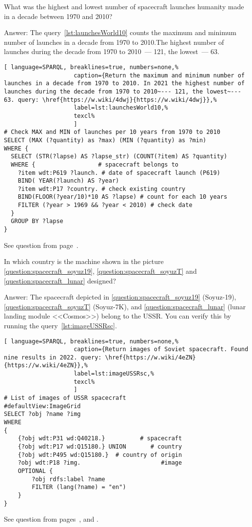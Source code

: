 \label{answer:max-min-space-launches}
\begin{exercise}
	What was the highest and lowest number of spacecraft launches humanity made in a decade between 1970 and 2010?
\end{exercise}
Answer: The query~\ref{lst:launchesWorld10} counts the maximum and minimum number of launches in a decade from 1970 to 2010.The highest number of launches during the decade from 1970 to 2010~--- 121, the lowest~--- 63.
\begin{lstlisting}[ language=SPARQL, breaklines=true, numbers=none,%
                    caption={Return the maximum and minimum number of launches in a decade from 1970 to 2010. In 2021 the highest number of launches during the decade from 1970 to 2010~--- 121, the lowest~--- 63. query: \href{https://w.wiki/4dwj}{https://w.wiki/4dwj}},%
                    label=lst:launchesWorld10,%
                    texcl%
                    ]
# Check MAX and MIN of launches per 10 years from 1970 to 2010
SELECT (MAX (?quantity) as ?max) (MIN (?quantity) as ?min)
WHERE {
  SELECT (STR(?lapse) AS ?lapse_str) (COUNT(?item) AS ?quantity)
  WHERE {                  # spacecraft belongs to
    ?item wdt:P619 ?launch. # date of spacecraft launch (P619)
    BIND( YEAR(?launch) AS ?year) 
    ?item wdt:P17 ?country. # check existing country
    BIND(FLOOR(?year/10)*10 AS ?lapse) # count for each 10 years
    FILTER (?year > 1969 && ?year < 2010) # check date
  } 
  GROUP BY ?lapse
}
\end{lstlisting}%
\small{See question from page~\pageref{question:spacecraft_2}.}

\label{answer:spacecraft_USSR}
\begin{exercise}
	In which country is the machine shown in the picture \ref{question:spacecraft_soyuz19}, \ref{question:spacecraft_soyuzT} and \ref{question:spacecraft_lunar} designed?
\end{exercise}
Answer: The spacecraft depicted in \ref{question:spacecraft_soyuz19} (Soyuz-19), \ref{question:spacecraft_soyuzT} (Soyuz-7K), and \ref{question:spacecraft_lunar} (lunar landing module <<Cosmos>>) belong to the USSR. You can verify this by running the query~\ref{lst:imageUSSRsc}.
\begin{lstlisting}[ language=SPARQL, breaklines=true, numbers=none,%
                    caption={Return images of Soviet spacecraft. Found nine results in 2022. query: \href{https://w.wiki/4eZN}{https://w.wiki/4eZN}},%
                    label=lst:imageUSSRsc,%
                    texcl%
                    ]
# List of images of USSR spacecraft
#defaultView:ImageGrid
SELECT ?obj ?name ?img
WHERE
{
    {?obj wdt:P31 wd:Q40218.}          # spacecraft
    {?obj wdt:P17 wd:Q15180.} UNION       # country
    {?obj wdt:P495 wd:Q15180.}  # country of origin
    ?obj wdt:P18 ?img.                       #image
    OPTIONAL {
		?obj rdfs:label ?name 
		FILTER (lang(?name) = "en")
	}
}
\end{lstlisting}%
\small{See question from pages~\pageref{question:spacecraft_soyuz19}, \pageref{question:spacecraft_soyuzT} and \pageref{question:spacecraft_lunar}.}

